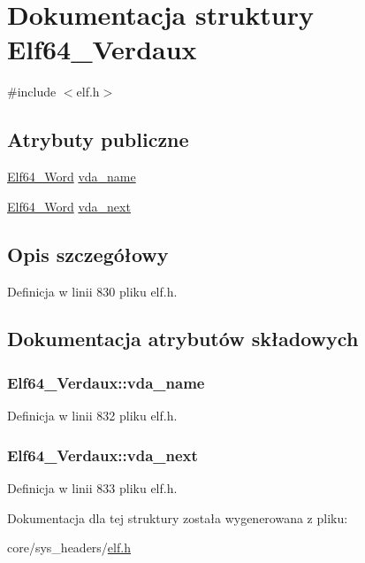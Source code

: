 \hypertarget{struct_elf64___verdaux}{\section{Dokumentacja struktury Elf64\-\_\-\-Verdaux}
\label{struct_elf64___verdaux}
}


{\ttfamily \#include $<$elf.\-h$>$}

\subsection*{Atrybuty publiczne}
\begin{DoxyCompactItemize}
\item 
\hyperlink{elf_8h_aa3aa1920ed115b7ef7e99716fece4401}{Elf64\-\_\-\-Word} \hyperlink{struct_elf64___verdaux_a76ef57da3e7a6f477d867b378dd976ce}{vda\-\_\-name}
\item 
\hyperlink{elf_8h_aa3aa1920ed115b7ef7e99716fece4401}{Elf64\-\_\-\-Word} \hyperlink{struct_elf64___verdaux_a550488ec793293fb872d8ec696faf9ff}{vda\-\_\-next}
\end{DoxyCompactItemize}


\subsection{Opis szczegółowy}


Definicja w linii 830 pliku elf.\-h.



\subsection{Dokumentacja atrybutów składowych}
\hypertarget{struct_elf64___verdaux_a76ef57da3e7a6f477d867b378dd976ce}{
\subsubsection[{vda\-\_\-name}]{ Elf64\-\_\-\-Verdaux\-::vda\-\_\-name}}\label{struct_elf64___verdaux_a76ef57da3e7a6f477d867b378dd976ce}


Definicja w linii 832 pliku elf.\-h.

\hypertarget{struct_elf64___verdaux_a550488ec793293fb872d8ec696faf9ff}{
\subsubsection[{vda\-\_\-next}]{ Elf64\-\_\-\-Verdaux\-::vda\-\_\-next}}\label{struct_elf64___verdaux_a550488ec793293fb872d8ec696faf9ff}


Definicja w linii 833 pliku elf.\-h.



Dokumentacja dla tej struktury została wygenerowana z pliku\-:\begin{DoxyCompactItemize}
\item 
core/sys\-\_\-headers/\hyperlink{elf_8h}{elf.\-h}\end{DoxyCompactItemize}
